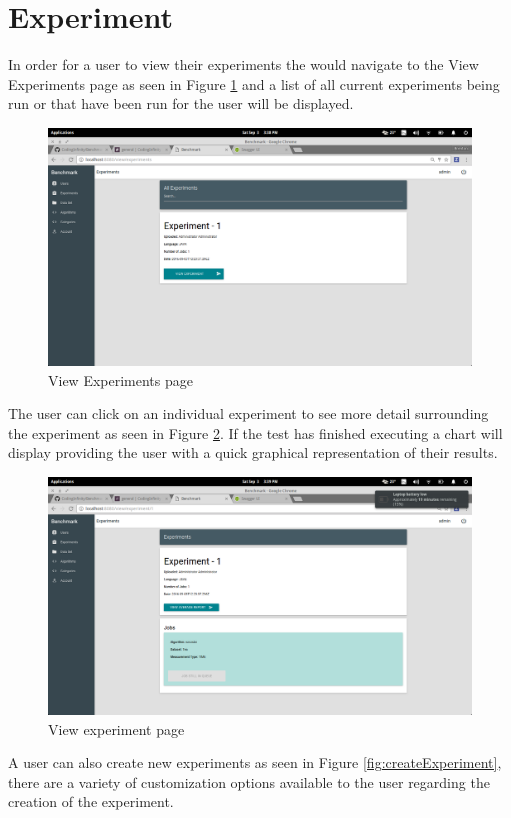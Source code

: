 \documentclass[11pt,a4paper]{article}
\begin{document}
\clearpage
\section{Experiment}
In order for a user to view their experiments the would navigate to the View Experiments
page as seen in Figure \ref{fig:viewExperiments} and a list of all current experiments 
being run or that have been run for the user will be displayed. 
\begin{figure}[H]
	\begin{center}
		\includegraphics[scale=0.3]{../Images/User Manual/View Experiments.png}
		\caption{View Experiments page}
		\label{fig:viewExperiments}
	\end{center}  
\end{figure}
\clearpage
 The user can click on an individual experiment to see more detail surrounding the experiment
 as seen in Figure \ref{fig:viewExperiment}. If the test has finished executing a chart will
 display providing the user with a quick graphical representation of their results.
\begin{figure}[H]
	\begin{center}
		\includegraphics[scale=0.3]{../Images/User Manual/View Experiment.png}
		\caption{View experiment page}
		\label{fig:viewExperiment}
	\end{center}  
\end{figure}
\clearpage
A user can also create new experiments as seen in Figure \ref{fig:createExperiment}, 
there are a variety of customization options available to the user regarding the creation
of the experiment.
\end{document}
